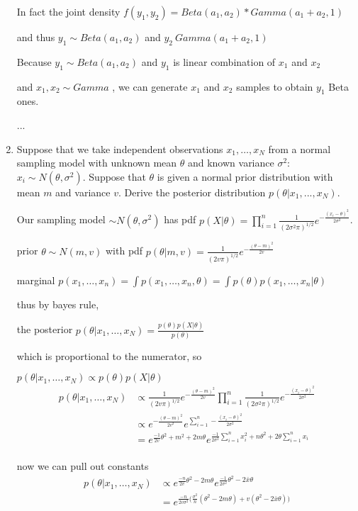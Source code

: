 \documentclass{homework}
\begin{document}
\begin{enumerate}[label=(\Alph*)]
\par In fact the joint density $f(y_1,y_2) = Beta(a_1,a_2) * Gamma(a_1 + a_2,1)$ 
\par and thus $y_1 \sim Beta(a_1,a_2)$ and $y_2 ~ Gamma(a_1 + a_2,1)$

Because $y_1 \sim Beta(a_1,a_2)$  and $y_1$ is linear combination of $x_1$ and $x_2$ 
\par and $x_1, x_2 \sim Gamma$ , we can generate $x_1$ and $x_2$ samples to obtain $y_1$ Beta ones.
\par ...

\item Suppose that we take independent observations $x_1, \dots , x_N$ from a normal sampling model with unknown mean $\theta$ and known variance $\sigma^2$: $x_i \sim N(\theta, \sigma^{2})$. Suppose that $\theta$ is given a normal prior distribution with mean $m$ and variance $v$. Derive the posterior distribution $p(\theta | x_1,...,x_N)$.
\par Our sampling model $\sim N(\theta,\sigma^2)$ has pdf $p( X | \theta ) = \prod_{i=1}^{n}\frac{1}{{(2\sigma^2\pi)}^{1/2}}e^{-\frac{(x_i - \theta)^2}{2\sigma^2}}$.
\par prior $\theta \sim N(m,v)$ with pdf $p( \theta | m,v ) = \frac{1}{{(2v\pi)}^{1/2}}e^{-\frac{(\theta - m)^2}{2v}}$
\par marginal $p(x_1, \dots , x_n) = \int p(x_1, \dots , x_n,\theta) = \int p(\theta)p(x_1, \dots , x_n | \theta)$
\par thus by bayes rule, \par the posterior $p(\theta | x_1,\dots, x_N) = \frac{ p(\theta) p(X | \theta)}{p(\theta)}$ 
\par which is proportional to the numerator, so \par $p(\theta | x_1,\dots, x_N) \propto p(\theta) p(X | \theta)$
\begin{equation} \begin{split}
p(\theta | x_1,\dots, x_N) &\propto  \frac{1}{{(2v\pi)}^{1/2}}e^{-\frac{(\theta - m)^2}{2v}} \prod_{i=1}^{n} \frac{1}{{(2\sigma^2\pi)}^{1/2}}e^{-\frac{(x_i - \theta)^2}{2\sigma^2}} \\
 &\propto e^{-\frac{(\theta - m)^2}{2v^2}}e^{\sum_{i=1}^{n} -\frac{(x_i - \theta)^2}{2\sigma^2}} \\
 & = e^{\frac{-1}{2v}\theta^2 + m^2 + 2m\theta}e^{\frac{-1}{2\sigma^2}\sum_{i=1}^{n} x_i^2 + n\theta^2 + 2\theta\sum_{i=1}^{n}x_i} \\
 \end{split} \end{equation}
\par now we can pull out constants
\begin{equation} \begin{split}
p(\theta | x_1,\dots, x_N) &\propto e^{\frac{-n}{2v}\theta^2 -2m\theta}e^{\frac{-1}{2\sigma^2}\theta^2 -2\bar{x}\theta} \\
& = e^{\frac{-n}{2v\sigma^2} \big( \frac{\sigma^2}{n}(\theta^2 -2m\theta) + v(\theta^2 -2\bar{x}\theta) \big)} \\
\end{split} \end{equation}


\end{enumerate}
\end{document}
